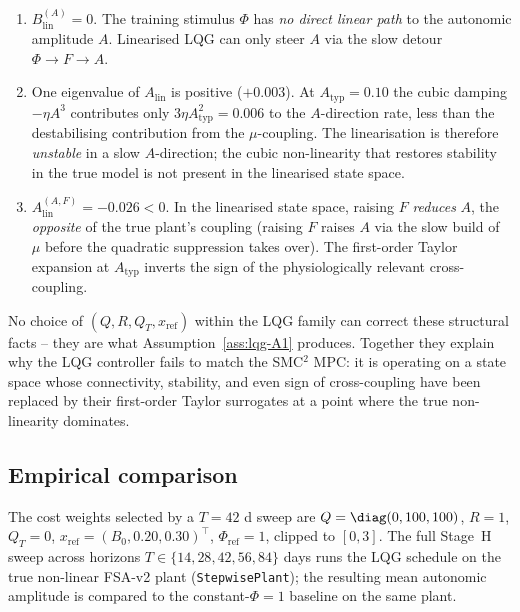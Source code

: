 \begin{enumerate}
  \item[(S1)] $B_{\mathrm{lin}}^{(A)} = 0$. The training stimulus
    $\Phi$ has \emph{no direct linear path} to the autonomic amplitude
    $A$. Linearised LQG can only steer $A$ via the slow detour
    $\Phi \to F \to A$.
  \item[(S2)] One eigenvalue of $A_{\mathrm{lin}}$ is positive
    ($+0.003$). At $A_{\mathrm{typ}} = 0.10$ the cubic damping
    $-\eta A^3$ contributes only
    $3\eta A_{\mathrm{typ}}^2 = 0.006$ to the $A$-direction rate, less
    than the destabilising contribution from the $\mu$-coupling. The
    linearisation is therefore \emph{unstable} in a slow $A$-direction;
    the cubic non-linearity that restores stability in the true model
    is not present in the linearised state space.
  \item[(S3)] $A_{\mathrm{lin}}^{(A,F)} = -0.026 < 0$. In the
    linearised state space, raising $F$ \emph{reduces} $A$, the
    \emph{opposite} of the true plant's coupling (raising $F$ raises
    $A$ via the slow build of $\mu$ before the quadratic suppression
    takes over). The first-order Taylor expansion at $A_{\mathrm{typ}}$
    inverts the sign of the physiologically relevant cross-coupling.
\end{enumerate}

No choice of $(Q,R,Q_T,x_{\mathrm{ref}})$ within the LQG family can
correct these structural facts -- they are what
Assumption~\ref{ass:lqg-A1} produces. Together they explain why the
LQG controller fails to match the SMC${}^2$ MPC: it is operating on a
state space whose connectivity, stability, and even sign of cross-coupling
have been replaced by their first-order Taylor surrogates at a point
where the true non-linearity dominates.

\subsection{Empirical comparison}\label{app:lqg-results}

The cost weights selected by a $T = 42$ d sweep are
$Q = \diag(0,100,100)$, $R = 1$, $Q_T = 0$,
$x_{\mathrm{ref}} = (B_0, 0.20, 0.30)^{\!\top}$,
$\Phi_{\mathrm{ref}} = 1$, clipped to $[0,3]$. The full Stage~H sweep
across horizons $T \in \{14,28,42,56,84\}$ days runs the LQG
schedule on the true non-linear FSA-v2 plant
(\texttt{StepwisePlant}); the resulting mean autonomic amplitude is
compared to the constant-$\Phi=1$ baseline on the same plant.

